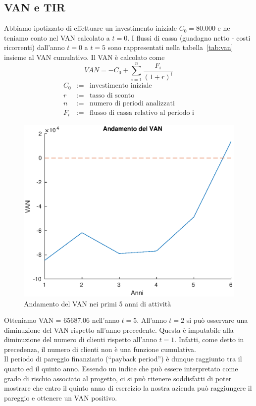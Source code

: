 \subsection{VAN e TIR}
Abbiamo ipotizzato di effettuare un investimento iniziale $C_0 = 80.000$ e ne teniamo conto nel VAN calcolato a $t=0$.
I flussi di cassa (guadagno netto - costi ricorrenti) dall’anno $t=0$ a $t=5$
sono rappresentati nella tabella~\ref{tab:van} insieme al VAN cumulativo.
Il VAN è calcolato come
\begin{displaymath}
VAN = - C_0 + \sum_{i=1}^n \frac{F_i}{(1 + r)^i}
\end{displaymath}
\begin{eqnarray*}
C_0 &:=& \mbox{investimento iniziale} \\
r &:=& \mbox{tasso di sconto} \\
n &:=& \mbox{numero di periodi analizzati} \\
F_i &:=& \mbox{flusso di cassa relativo al periodo i}
\end{eqnarray*}

%
\begin{figure}[!h]
\centering
\includegraphics[width=\textwidth]{figures/van}
\caption{Andamento del VAN nei primi 5 anni di attività}
\label{van}
\end{figure}
%

Otteniamo VAN = 65687.06 nell'anno $t=5$. All'anno $t=2$ si può osservare una diminuzione del VAN rispetto all'anno precedente. Questa è imputabile alla diminuzione del numero di clienti rispetto all'anno $t=1$. Infatti, come detto in precedenza, il numero di clienti non è una funzione cumulativa.\\
Il periodo di pareggio finanziario (“payback period”) è dunque raggiunto tra il
quarto ed il quinto anno. Essendo un indice che può essere interpretato come
grado di rischio associato al progetto, ci si può ritenere soddisfatti di poter
mostrare che entro il quinto anno di esercizio la nostra azienda può raggiungere
il pareggio e ottenere un VAN positivo.

